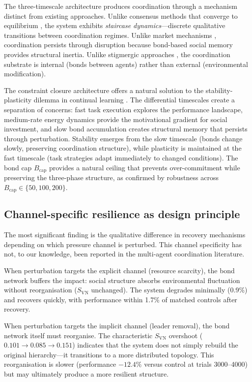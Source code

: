 \documentclass[12pt]{article}
\begin{document}
The three-timescale architecture produces coordination through a mechanism distinct from existing approaches. Unlike consensus methods that converge to equilibrium \cite{olfati2004,ren2005}, the system exhibits \emph{staircase dynamics}---discrete qualitative transitions between coordination regimes. Unlike market mechanisms \cite{dias2006}, coordination persists through disruption because bond-based social memory provides structural inertia. Unlike stigmergic approaches \cite{dorigo2000,theraulaz1999}, the coordination substrate is internal (bonds between agents) rather than external (environmental modification).

The constraint closure architecture offers a natural solution to the stability-plasticity dilemma in continual learning \cite{parisi2019}. The differential timescales create a separation of concerns: fast task execution explores the performance landscape, medium-rate energy dynamics provide the motivational gradient for social investment, and slow bond accumulation creates structural memory that persists through perturbation. Stability emerges from the slow timescale (bonds change slowly, preserving coordination structure), while plasticity is maintained at the fast timescale (task strategies adapt immediately to changed conditions). The bond cap $B_\mathrm{cap}$ provides a natural ceiling that prevents over-commitment while preserving the three-phase structure, as confirmed by robustness across $B_\mathrm{cap} \in \{50, 100, 200\}$.


\subsection{Channel-specific resilience as design principle}
\label{sec:disc_resilience}

The most significant finding is the qualitative difference in recovery mechanisms depending on which pressure channel is perturbed. This channel specificity has not, to our knowledge, been reported in the multi-agent coordination literature.

When perturbation targets the explicit channel (resource scarcity), the bond network buffers the impact: social structure absorbs environmental fluctuation without reorganisation ($S_\mathrm{VN}$ unchanged). The system degrades minimally (0.9\%) and recovers quickly, with performance within 1.7\% of matched controls after recovery.

When perturbation targets the implicit channel (leader removal), the bond network itself must reorganise. The characteristic $S_\mathrm{VN}$ overshoot ($0.101 \to 0.085 \to 0.151$) indicates that the system does not simply rebuild the original hierarchy---it transitions to a more distributed topology. This reorganisation is slower (performance $-12.4\%$ versus control at trials 3000--4000) but may ultimately produce a more resilient structure.
\end{document}
